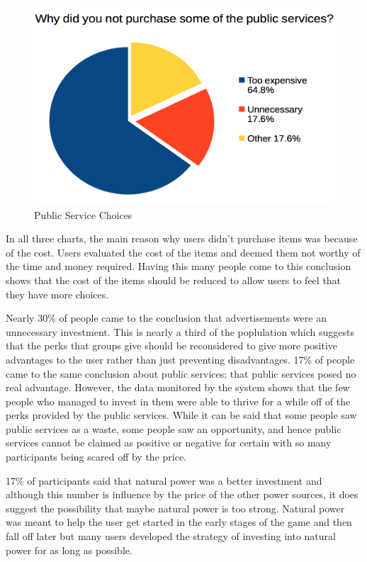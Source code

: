 \documentclass[msc,oneside]{ubcthesis}%
\begin{document}
\begin{figure}[hbt]
  \begin{center}
    \includegraphics[width=1\textwidth]{survey_pics/numeric/public_service}
    \caption[Public Service Choices]{Public Service Choices}\label{publicServices}
  \end{center}
\end{figure}

\newpage
In all three charts, the main reason why users didn't purchase items was because of the cost. Users evaluated the cost of the items and deemed them not worthy of the time and money required. Having this many people come to this conclusion shows that the cost of the items should be reduced to allow users to feel that they have more choices.

Nearly 30\% of people came to the conclusion that advertisements were an unnecessary investment. This is nearly a third of the poplulation which suggests that the perks that groups give should be reconsidered to give more positive advantages to the user rather than just preventing disadvantages. 17\% of people came to the same conclusion about public services; that public services posed no real advantage. However, the data monitored by the system shows that the few people who managed to invest in them were able to thrive for a while off of the perks provided by the public services. While it can be said that some people saw public services as a waste, some people saw an opportunity, and hence public services cannot be claimed as positive or negative for certain with so many participants being scared off by the price. 

17\% of participants said that natural power was a better investment and although this number is influence by the price of the other power sources, it does suggest the possibility that maybe natural power is too strong. Natural power was meant to help the user get started in the early stages of the game and then fall off later but many users developed the strategy of investing into natural power for as long as possible. 
\end{document}
